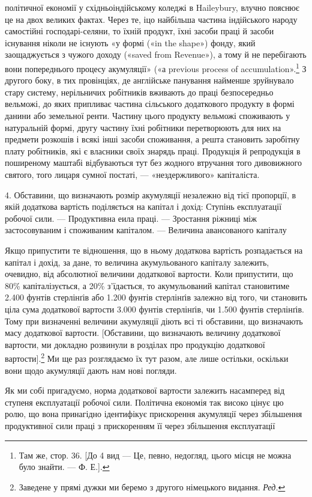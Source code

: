 політичної економії у східньоіндійському коледжі в Haileybury,
влучно пояснює це на двох великих фактах. Через те, іцо
найбільша частина індійського народу самостійні господарі-селяни,
то їхній продукт, їхні засоби праці й засоби існування
ніколи не існують «у формі («in the shape») фонду, який заощаджується
з чужого доходу («saved from Revenue»), а тому
й не перебігають вони попереднього процесу акумуляції» («а
previous process of accumulation».\footnote{
Там же, стор. 36. [До 4 вид — Це, певно, недогляд, цього місця
не можна було знайти. — Ф. Е.].
} З другого боку, в тих провінціях,
де англійське панування найменше зруйнувало стару
систему, нерільничих робітників вживають до праці безпосередньо
вельможі, до яких припливає частина сільського додаткового продукту
в формі данини або земельної ренти. Частину цього продукту
вельможі споживають у натуральній формі, другу частину
їхні робітники перетворюють для них на предмети розкошів
і всякі інші засоби споживання, а решта становить заробітну
плату робітників, які є власники своїх знарядь праці. Продукція
й репродукція в поширеному маштабі відбуваються тут без
жодного втручання того дивовижного святого, того лицаря сумної
постаті, — «нездержливого» капіталіста.

4. Обставини, що визначають розмір акумуляції незалежно від
тієї пропорції, в якій додаткова вартість поділяється на капітал
і дохід: Ступінь експлуатації робочої сили. — Продуктивна
еила праці. — Зростання ріжниці між застосовуваним і споживаним
капіталом. — Величина авансованого капіталу

Якщо припустити те відношення, що в ньому додаткова вартість
розпадається на капітал і дохід, за дане, то величина акумульованого
капіталу залежить, очевидно, від абсолютної величини
додаткової вартости. Коли припустити, що 80\% капіталізується,
а 20\% з’їдається, то акумульований капітал становитиме
2.400 фунтів стерлінґів або 1.200 фунтів стерлінґів залежно
від того, чи становить ціла сума додаткової вартости 3.000 фунтів
стерлінґів, чи 1.500 фунтів стерлінґів. Тому при визначенні
величини акумуляції діють всі ті обставини, що визначають масу
додаткової вартости. [Обставини, що визначають величину додаткової
вартости, ми докладно розвинули в розділах про продукцію
додаткової вартости].\footnote*{
Заведене у прямі дужки ми беремо з другого німецького видання.
\emph{Ред.}
} Ми ще раз розглядаємо їх тут
разом, але лише остільки, оскільки вони щодо акумуляції дають
нам нові погляди.

Як ми собі пригадуємо, норма додаткової вартости залежить
насамперед від ступеня експлуатації робочої сили. Політична
економія так високо цінує цю ролю, що вона принагідно ідентифікує
прискорення акумуляції через збільшення продуктивної
сили праці з прискоренням її через збільшення експлуатації